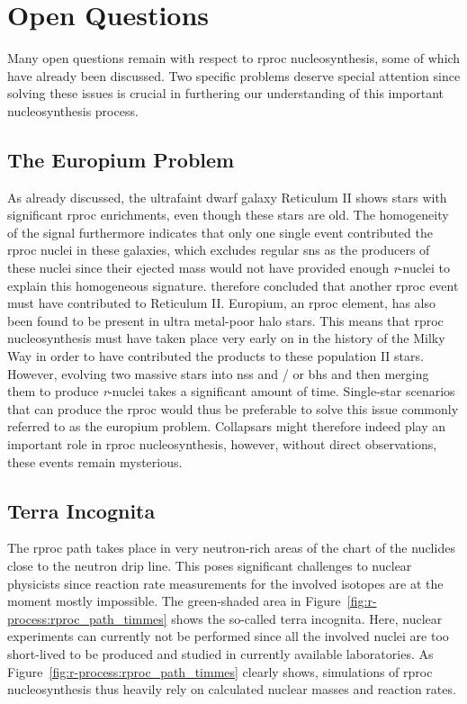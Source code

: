 \section{Open Questions}

Many open questions remain with respect to \ac{rproc} nucleosynthesis, some of which have already been discussed. Two specific problems deserve special attention since solving these issues is crucial in furthering our understanding of this important nucleosynthesis process.


\subsection{The Europium Problem}\label{sec:r-process:open_questions:europium_problem}

As already discussed, the ultrafaint dwarf galaxy Reticulum II shows stars with significant \ac{rproc} enrichments, even though these stars are old. The homogeneity of the signal furthermore indicates that only one single event contributed the \ac{rproc} nuclei in these galaxies, which excludes regular \acp{sn} as the producers of these nuclei since their ejected mass would not have provided enough \textit{r}-nuclei to explain this homogeneous signature. \citet{ji16} therefore concluded that another \ac{rproc} event must have contributed to Reticulum II. Europium, an \ac{rproc} element, has also been found to be present in ultra metal-poor halo stars. This means that \ac{rproc} nucleosynthesis must have taken place very early on in the history of the Milky Way in order to have contributed the products to these population II stars. However, evolving two massive stars into \acp{ns} and / or \acp{bh} and then merging them to produce \textit{r}-nuclei takes a significant amount of time. Single-star scenarios that can produce the \ac{rproc} would thus be preferable to solve this issue commonly referred to as the europium problem. Collapsars might therefore indeed play an important role in \ac{rproc} nucleosynthesis, however, without direct observations, these events remain mysterious.

\subsection{Terra Incognita}

The \ac{rproc} path takes place in very neutron-rich areas of the chart of the nuclides close to the neutron drip line. This poses significant challenges to nuclear physicists since reaction rate measurements for the involved isotopes are at the moment mostly impossible. The green-shaded area in Figure~\ref{fig:r-process:rproc_path_timmes} shows the so-called terra incognita. Here, nuclear experiments can currently not be performed since all the involved nuclei are too short-lived to be produced and studied in currently available laboratories. As Figure~\ref{fig:r-process:rproc_path_timmes} clearly shows, simulations of \ac{rproc} nucleosynthesis thus heavily rely on calculated nuclear masses and reaction rates. 

